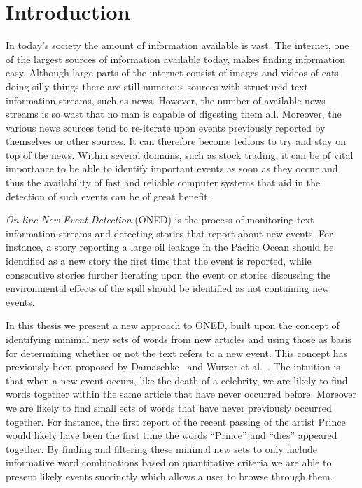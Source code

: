 \chapter{Introduction}
\label{chapter:introduction}
In today's society the amount of information available is vast. The internet, one of the largest sources of information available today, makes finding information easy. Although large parts of the internet consist of images and videos of cats doing silly things there are still numerous sources with structured text information streams, such as news. However, the number of available news streams is so wast that no man is capable of digesting them all. Moreover, the various news sources tend to re-iterate upon events previously reported by themselves or other sources. It can therefore become tedious to try and stay on top of the news. 
Within several domains, such as stock trading, it can be of vital importance to be able to identify important events as soon as they occur and thus the availability of fast and reliable computer systems that aid in the detection of such events can be of great benefit. 


\emph{On-line New Event Detection} (ONED) is the process of monitoring text information streams and detecting stories that report about new events. For instance, a story reporting a large oil leakage in the Pacific Ocean should be identified as a new story the first time that the event is reported, while consecutive stories further iterating upon the event or stories discussing the environmental effects of the spill should be identified as not containing new events. 

In this thesis we present a new approach to ONED, built upon the concept of identifying minimal new sets of words from new articles and using those as basis for determining whether or not the text refers to a new event. This concept has previously been proposed by Damaschke~\cite{damaschke2015pairs} and Wurzer et al.~\cite{wurzer2015kterm}. The intuition is that when a new event occurs, like the death of a celebrity, we are likely to find words together within the same article that have never occurred before. Moreover we are likely to find small sets of words that have never previously occurred together. For instance, the first report of the recent passing of the artist Prince would likely have been the first time the words ``Prince'' and ``dies'' appeared together. By finding and filtering these minimal new sets to only include informative word combinations based on quantitative criteria we are able to present likely events succinctly which allows a user to browse through them.

